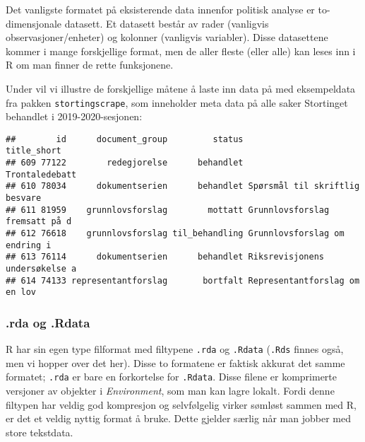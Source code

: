 \documentclass[
]{article}
\newenvironment{Shaded}{\begin{snugshade}}{\end{snugshade}}
\newcommand{\AttributeTok}[1]{\textcolor[rgb]{0.77,0.63,0.00}{#1}}
\newcommand{\DecValTok}[1]{\textcolor[rgb]{0.00,0.00,0.81}{#1}}
\newcommand{\FunctionTok}[1]{\textcolor[rgb]{0.00,0.00,0.00}{#1}}
\newcommand{\NormalTok}[1]{#1}
\newcommand{\OtherTok}[1]{\textcolor[rgb]{0.56,0.35,0.01}{#1}}
\newcommand{\SpecialCharTok}[1]{\textcolor[rgb]{0.00,0.00,0.00}{#1}}
\begin{document}
Det vanligste formatet på eksisterende data innenfor politisk analyse er
to-dimensjonale datasett. Et datasett består av rader (vanligvis
observasjoner/enheter) og kolonner (vanligvis variabler). Disse
datasettene kommer i mange forskjellige format, men de aller fleste
(eller alle) kan leses inn i R om man finner de rette funksjonene.

Under vil vi illustre de forskjellige måtene å laste inn data på med
eksempeldata fra pakken \texttt{stortingscrape}, som inneholder meta
data på alle saker Stortinget behandlet i 2019-2020-sesjonen:

\begin{Shaded}
\end{Shaded}

\begin{verbatim}
##        id      document_group         status                    title_short
## 609 77122        redegjorelse      behandlet                 Trontaledebatt
## 610 78034      dokumentserien      behandlet Spørsmål til skriftlig besvare
## 611 81959    grunnlovsforslag        mottatt Grunnlovsforslag fremsatt på d
## 612 76618    grunnlovsforslag til_behandling Grunnlovsforslag om endring i 
## 613 76114      dokumentserien      behandlet Riksrevisjonens undersøkelse a
## 614 74133 representantforslag       bortfalt Representantforslag om en lov
\end{verbatim}

\hypertarget{rda-og-.rdata}{%
\subsubsection{.rda og .Rdata}\label{rda-og-.rdata}}

R har sin egen type filformat med filtypene \texttt{.rda} og
\texttt{.Rdata} (\texttt{.Rds} finnes også, men vi hopper over det her).
Disse to formatene er faktisk akkurat det samme formatet; \texttt{.rda}
er bare en forkortelse for \texttt{.Rdata}. Disse filene er komprimerte
versjoner av objekter i \emph{Environment}, som man kan lagre lokalt.
Fordi denne filtypen har veldig god kompresjon og selvfølgelig virker
sømløst sammen med R, er det et veldig nyttig format å bruke. Dette
gjelder særlig når man jobber med store tekstdata.
\end{document}
